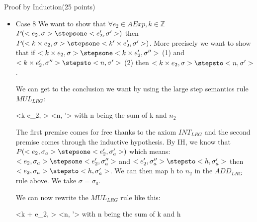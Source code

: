 \documentclass{article}
\begin{document}
\begin{question}{Proof by Induction}{(25 points)}
\begin{subquestion}
\begin{itemize}
\item Case 8 We want to show that $\forall e_2 \in AExp, k \in \mathbb{Z}$ $P(<e_2, \sigma> \stepsone <e_2', \sigma'>)$ then $P(<k \times e_2, \sigma> \stepsone <k' \times e_2', \sigma'>)$. More precisely we want to show that if $<k \times e_2, \sigma> \stepsone <k \times e_2', \sigma''>$ (1) and $<k \times e_2', \sigma''> \stepsto <n, \sigma'>$ (2) then $<k \times e_2, \sigma> \stepsto <n, \sigma'>$.


We can get to the conclusion we want by using the large step semantics rule $MUL_{LRG}$:

{
	<k \times e_2, \sigma> \stepsto <n, \sigma'>
}
{
	with n being the sum of k and $n_2$
}

The first premise comes for free thanks to the axiom $INT_{LRG}$ and the second premise comes through the inductive hypothesis. By IH, we know that $P(<e_2, \sigma_a>  \stepsone <e_2', \sigma_a'>)$ which means: $<e_2, \sigma_a> \stepsone <e_2', \sigma_a''>$ and $<e_2', \sigma_a''> \stepsto <h, \sigma_a'>$ then $<e_2, \sigma_a> \stepsto <h, \sigma_a'>$. We can then map h to $n_2$ in the $ADD_{LRG}$ rule above. We take $\sigma = \sigma_a$.

We can now rewrite the $MUL_{LRG}$ rule like this:

{
	<k + e_2, \sigma> \stepsto <n, \sigma'>
}
{
	with n being the sum of k and h
}






\end{itemize}
\end{subquestion}
\end{question}
\end{document}
